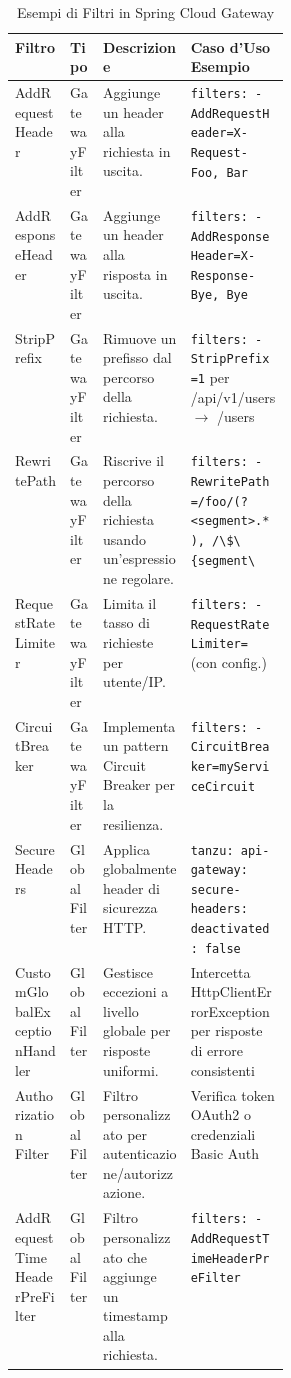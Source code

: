 \begin{table}[htbp]
\centering
\caption{Esempi di Filtri in Spring Cloud Gateway}
\renewcommand{\arraystretch}{1.5}
\label{tab:filtri_scg_}
\begin{tabularx}{\linewidth}{%
    >{\RaggedRight\arraybackslash}p{0.2\linewidth} 
    >{\RaggedRight\arraybackslash}p{0.12\linewidth} 
    >{\RaggedRight\arraybackslash}X                 
    >{\RaggedRight\arraybackslash}X                 
}
\toprule
\textbf{Filtro} & \textbf{Tipo} & \textbf{Descrizione} & \textbf{Caso d'Uso Esempio} \\
\midrule
AddRequestHeader & GatewayFilter & Aggiunge un header alla richiesta in uscita. & \lstinline{filters: - AddRequestHeader=X-Request-Foo, Bar} \\
AddResponseHeader & GatewayFilter & Aggiunge un header alla risposta in uscita. & \lstinline{filters: - AddResponseHeader=X-Response-Bye, Bye} \\
StripPrefix & GatewayFilter & Rimuove un prefisso dal percorso della richiesta. & \lstinline{filters: - StripPrefix=1} per /api/v1/users $\rightarrow$ /users \\
RewritePath & GatewayFilter & Riscrive il percorso della richiesta usando un'espressione regolare. & \lstinline{filters: - RewritePath=/foo/(?<segment>.*), /\$\{segment\}} \\
RequestRateLimiter & GatewayFilter & Limita il tasso di richieste per utente/IP. & \lstinline{filters: - RequestRateLimiter=} (con config.) \\
CircuitBreaker & GatewayFilter & Implementa un pattern Circuit Breaker per la resilienza. & \lstinline{filters: - CircuitBreaker=myServiceCircuit} \\
SecureHeaders & GlobalFilter & Applica globalmente header di sicurezza HTTP. & \lstinline{tanzu: api-gateway: secure-headers: deactivated: false} \\
CustomGlobal\-ExceptionHandler & GlobalFilter & Gestisce eccezioni a livello globale per risposte uniformi. & Intercetta HttpClientErrorException per risposte di errore consistenti \\
Authorization Filter & GlobalFilter & Filtro personalizzato per autenticazione/autorizzazione. & Verifica token OAuth2 o credenziali Basic Auth \\
AddRequestTime\-Header\-PreFilter & GlobalFilter & Filtro personalizzato che aggiunge un timestamp alla richiesta. & \lstinline{filters: - AddRequestTimeHeaderPreFilter} \\
\bottomrule
\end{tabularx}
\end{table}

